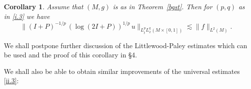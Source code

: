 \documentclass[10pt]{amsart}
\newtheorem{corr}[theorem]{Corollary}
\newcommand{\la}{\lambda}
\newcommand{\one}{{\bf 1}}
\newcommand{\1}{{\bf 1}}
\begin{document}
\begin{corr}\label{bgsta}  Assume that $(M,g)$ is as in Theorem~\ref{bgst}.  Then for $(p,q)$ as in \eqref{i.3}
we have
\begin{equation}\label{i.3'}
\|(I+P)^{-1/p} \, (\log(2I+P))^{1/p} \, u\|_{L^p_tL^q_x(M\times [0,1])}\lesssim \|f\|_{L^2(M)}.
\end{equation}
\end{corr}


We shall postpone further discussion of the Littlewood-Paley estimates which can be used and the 
proof of this corollary in \S4.


We shall also be able to obtain similar improvements of the universal estimates \eqref{ii.3}:


\end{document}
